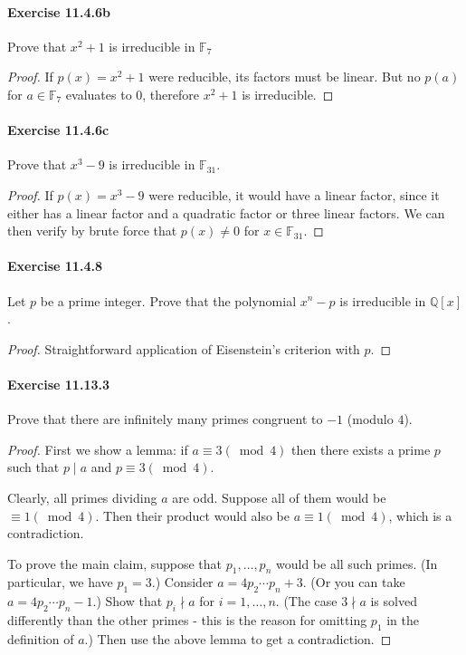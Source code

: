 \documentclass{article}
\begin{document}
\paragraph{Exercise 11.4.6b} Prove that $x^2+1$ is irreducible in $\mathbb{F}_7$
\begin{proof}
    If $p(x)=x^2+1$ were reducible, its factors must be linear. But no $p(a)$ for $a\in\mathbb{F}_7$ evaluates to 0, therefore $x^2+1$ is irreducible. 
\end{proof}



\paragraph{Exercise 11.4.6c} Prove that $x^3 - 9$ is irreducible in $\mathbb{F}_{31}$.
\begin{proof}
    If $p(x) = x^3-9$ were reducible, it would have a linear factor, since it either has a linear factor and a quadratic factor or three linear factors. We can then verify by brute force that $p(x)\neq 0$ for $x \in \mathbb{F}_31$. 
\end{proof}



\paragraph{Exercise 11.4.8} Let $p$ be a prime integer. Prove that the polynomial $x^n-p$ is irreducible in $\mathbb{Q}[x]$.
\begin{proof}
   Straightforward application of Eisenstein's criterion with $p$.  
\end{proof}

\paragraph{Exercise 11.13.3} Prove that there are infinitely many primes congruent to $-1$ (modulo $4$).
\begin{proof}
    First we show a lemma: if $a \equiv 3(\bmod 4)$ then there exists a prime $p$ such that $p \mid a$ and $p \equiv 3(\bmod 4)$.

    Clearly, all primes dividing $a$ are odd. Suppose all of them would be $\equiv 1(\bmod 4)$. Then their product would also be $a \equiv 1(\bmod 4)$, which is a contradiction.

To prove the main claim, suppose that $p_1, \ldots, p_n$ would be all such primes. (In particular, we have $p_1=3$.) Consider $a=4 p_2 \cdots p_n+3$. (Or you can take $a=4 p_2 \cdots p_n-1$.) Show that $p_i \nmid a$ for $i=1, \ldots, n$. (The case $3 \nmid a$ is solved differently than the other primes - this is the reason for omitting $p_1$ in the definition of $a$.) Then use the above lemma to get a contradiction.
\end{proof}
\end{document}
